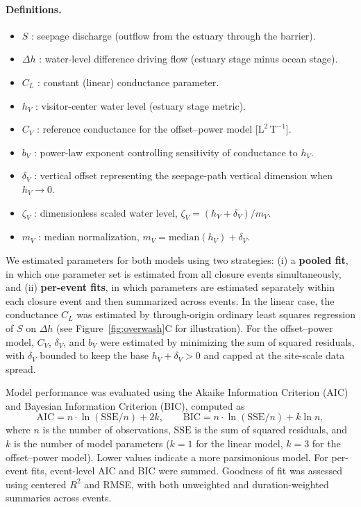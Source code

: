 \documentclass[preprint,12pt,authoryear]{elsarticle}
\begin{document}
\paragraph{Definitions.}
\begin{itemize}
  \item $S$ : seepage discharge (outflow from the estuary through the barrier).
  \item $\Delta h$ : water-level difference driving flow (estuary stage minus ocean stage).
  \item $C_L$ : constant (linear) conductance parameter.
  \item $h_V$ : visitor-center water level (estuary stage metric).
  \item $C_V$ : reference conductance for the offset--power model [$\mathrm{L}^2\,\mathrm{T}^{-1}$].
  \item $b_V$ : power-law exponent controlling sensitivity of conductance to $h_V$.
  \item $\delta_V$ : vertical offset representing the seepage-path vertical dimension when $h_V \to 0$.
  \item $\zeta_V$ : dimensionless scaled water level, $\zeta_V = (h_V + \delta_V)/m_V$.
  \item $m_V$ : median normalization, $m_V = \mathrm{median}(h_V) + \delta_V$.
\end{itemize}




We estimated parameters for both models using two strategies: (i) a \textbf{pooled fit}, in which one parameter set is estimated from all closure events simultaneously, and (ii) \textbf{per-event fits}, in which parameters are estimated separately within each closure event and then summarized across events.
In the linear case, the conductance $C_L$ was estimated by through-origin ordinary least squares regression of $S$ on $\Delta h$ (see Figure~\ref{fig:overwash}C for illustration).
For the offset--power model, $C_V$, $\delta_V$, and $b_V$ were estimated by minimizing the sum of squared residuals, with $\delta_V$ bounded to keep the base $h_V + \delta_V > 0$ and capped at the site-scale data spread.

Model performance was evaluated using the Akaike Information Criterion (AIC) and Bayesian Information Criterion (BIC), computed as
\begin{equation}
    \mathrm{AIC} = n \cdot \ln(\mathrm{SSE}/n) + 2k,
    \qquad
    \mathrm{BIC} = n \cdot \ln(\mathrm{SSE}/n) + k \ln n,
\end{equation}
where $n$ is the number of observations, $\mathrm{SSE}$ is the sum of squared residuals, and $k$ is the number of model parameters ($k = 1$ for the linear model, $k = 3$ for the offset--power model). Lower values indicate a more parsimonious model. For per-event fits, event-level AIC and BIC were summed. Goodness of fit was assessed using centered $R^2$ and RMSE, with both unweighted and duration-weighted summaries across events.
\end{document}
